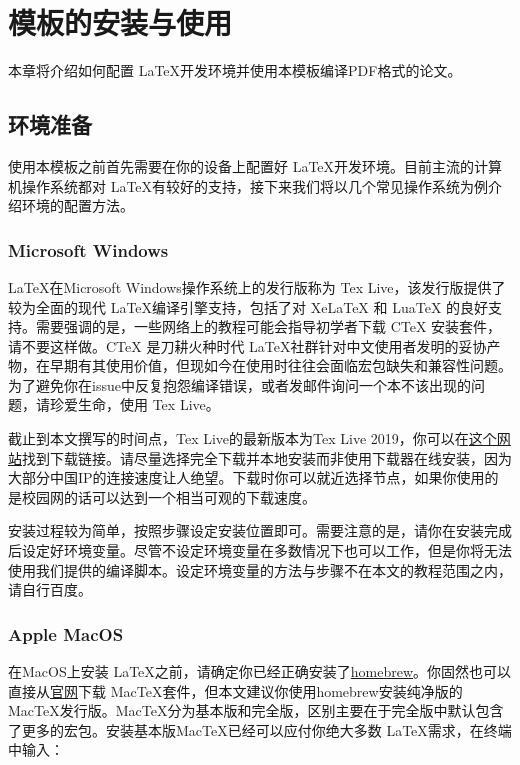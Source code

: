 \chapter{模板的安装与使用}
\label{chp:installation}

本章将介绍如何配置 \LaTeX 开发环境并使用本模板编译PDF格式的论文。

\section{环境准备}
\label{sec:tex_environment}

使用本模板之前首先需要在你的设备上配置好 \LaTeX 开发环境。目前主流的计算机操作系统都对 \LaTeX 有较好的支持，接下来我们将以几个常见操作系统为例介绍环境的配置方法。

\subsection{Microsoft Windows\texttrademark}

\LaTeX 在Microsoft Windows操作系统上的发行版称为 Tex Live，该发行版提供了较为全面的现代 \LaTeX 编译引擎支持，包括了对 XeLaTeX 和 LuaTeX 的良好支持。需要强调的是，一些网络上的教程可能会指导初学者下载 CTeX 安装套件，请不要这样做。CTeX 是刀耕火种时代 \LaTeX 社群针对中文使用者发明的妥协产物，在早期有其使用价值，但现如今在使用时往往会面临宏包缺失和兼容性问题\cite{muzi2020ctex}。为了避免你在issue中反复抱怨编译错误，或者发邮件询问一个本不该出现的问题，请珍爱生命，使用 Tex Live。

截止到本文撰写的时间点，Tex Live的最新版本为Tex Live 2019，你可以在\href{http://tug.org/texlive/}{这个网站}找到下载链接。请尽量选择完全下载并本地安装而非使用下载器在线安装，因为大部分中国IP的连接速度让人绝望。下载时你可以就近选择节点，如果你使用的是校园网的话可以达到一个相当可观的下载速度。

安装过程较为简单，按照步骤设定安装位置即可。需要注意的是，请你在安装完成后设定好环境变量。尽管不设定环境变量在多数情况下也可以工作，但是你将无法使用我们提供的编译脚本。设定环境变量的方法与步骤不在本文的教程范围之内，请自行百度。

\subsection{Apple MacOS\texttrademark}

在MacOS上安装 \LaTeX 之前，请确定你已经正确安装了\href{https://brew.sh/}{homebrew}。你固然也可以直接从\href{http://www.tug.org/mactex/index.html}{官网}下载 MacTeX套件，但本文建议你使用homebrew安装纯净版的MacTeX发行版。MacTeX分为基本版和完全版，区别主要在于完全版中默认包含了更多的宏包。安装基本版MacTeX已经可以应付你绝大多数 \LaTeX 需求，在终端中输入：

